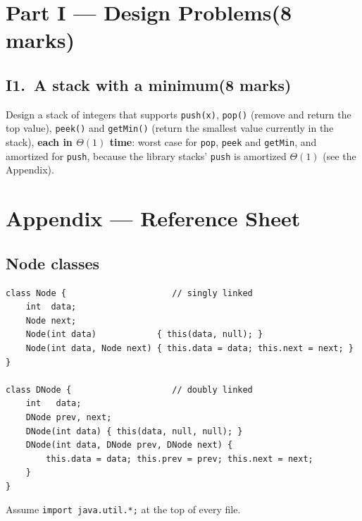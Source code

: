 \documentclass[11pt]{article}
\newcommand{\code}[1]{\mbox{\texttt{#1}}}  %
\newcommand{\score}[1]{{\unskip\nobreak\hfil\penalty50
  \hskip2em\hbox{}\nobreak\hfil\mbox{[\hspace{2.5em}/\,#1\,]}%
  \parfillskip=0pt \finalhyphendemerits=0 \par}}
\newcommand{\partheading}[4][12\baselineskip]{\needspace{#1}%
  \section*{Part #2 --- #3\hfill{\normalsize\normalfont(#4 marks)}}}
\newcommand{\question}[4][8\baselineskip]{\needspace{#1}%
  \subsection*{#2.\ #3\hfill{\normalsize\normalfont(#4 marks)}}}
\begin{document}
\partheading[22\baselineskip]{I}{Design Problems}{8}

\question{I1}{A stack with a minimum}{8}
Design a stack of integers that supports \code{push(x)}, \code{pop()}
(remove and return the top value), \code{peek()} and \code{getMin()} (return
the smallest value currently in the stack), \textbf{each in $\Theta(1)$
time}: worst case for \code{pop}, \code{peek} and \code{getMin}, and
amortized for \code{push}, because the library stacks' \code{push} is
amortized $\Theta(1)$ (see the Appendix).

\clearpage
\section*{Appendix --- Reference Sheet}

\subsection*{Node classes}
\begin{lstlisting}
class Node {                     // singly linked
    int  data;
    Node next;
    Node(int data)            { this(data, null); }
    Node(int data, Node next) { this.data = data; this.next = next; }
}

class DNode {                    // doubly linked
    int   data;
    DNode prev, next;
    DNode(int data) { this(data, null, null); }
    DNode(int data, DNode prev, DNode next) {
        this.data = data; this.prev = prev; this.next = next;
    }
}
\end{lstlisting}
Assume \code{import java.util.*;} at the top of every file.
\end{document}
